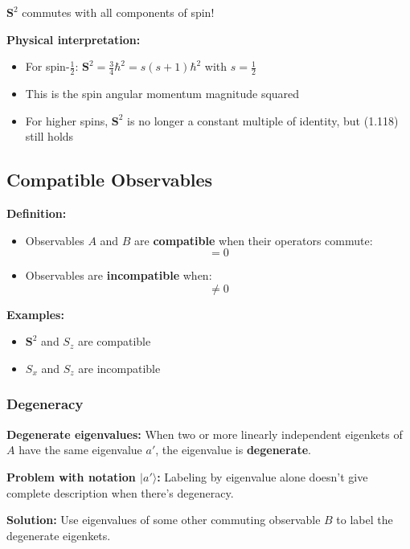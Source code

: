 \documentclass[11pt,a4paper]{article}
\begin{document}
$\mathbf{S}^2$ commutes with all components of spin!

\textbf{Physical interpretation:}
\begin{itemize}
\item For spin-$\frac{1}{2}$: $\mathbf{S}^2 = \frac{3}{4}\hbar^2 = s(s+1)\hbar^2$ with $s = \frac{1}{2}$
\item This is the spin angular momentum magnitude squared
\item For higher spins, $\mathbf{S}^2$ is no longer a constant multiple of identity, but (1.118) still holds
\end{itemize}

\subsection{Compatible Observables}

\textbf{Definition:}
\begin{itemize}
\item Observables $A$ and $B$ are \textbf{compatible} when their operators commute:
\begin{equation}
[A, B] = 0
\tag{1.119}
\end{equation}

\item Observables are \textbf{incompatible} when:
\begin{equation}
[A, B] \neq 0
\tag{1.120}
\end{equation}
\end{itemize}

\textbf{Examples:}
\begin{itemize}
\item $\mathbf{S}^2$ and $S_z$ are compatible
\item $S_x$ and $S_z$ are incompatible
\end{itemize}

\subsubsection{Degeneracy}

\textbf{Degenerate eigenvalues:} When two or more linearly independent eigenkets of $A$ have the same eigenvalue $a'$, the eigenvalue is \textbf{degenerate}.

\textbf{Problem with notation $|a'\rangle$:} Labeling by eigenvalue alone doesn't give complete description when there's degeneracy.

\textbf{Solution:} Use eigenvalues of some other commuting observable $B$ to label the degenerate eigenkets.
\end{document}
